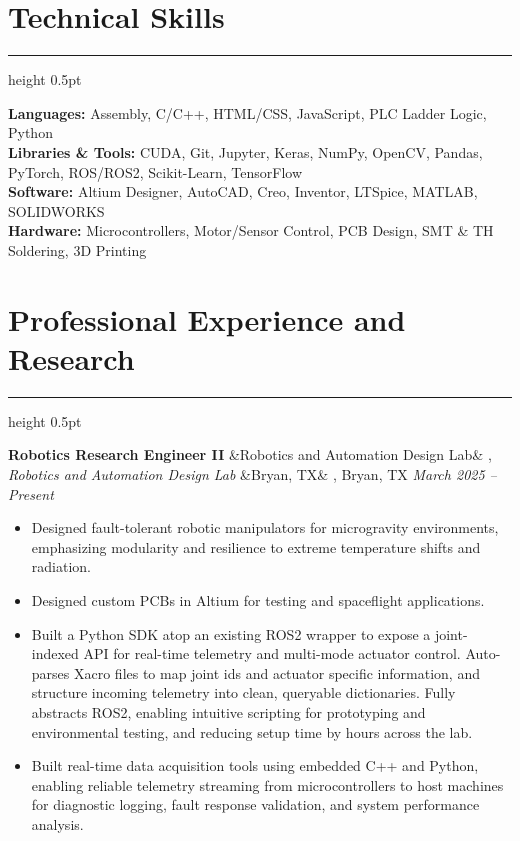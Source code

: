 \documentclass[letterpaper,10pt]{article}
\newcommand{\heading}[1]{%
    \vspace{-5mm} %
    \section*{#1}%
    \vspace{-3mm}%
    \noindent\hrule height 0.5pt %
    \vspace{4mm}%
}
\newcommand{\experience}[5]{%
    \noindent\textbf{#1}%
    \ifx&#2&
    \else
        , \textit{#2}%
    \fi
    \ifx&#3&
    \else
        , #3%
    \fi
    \hfill \textit{#4} \\
    \vspace{-6.8mm}%
    \begin{itemize}[itemsep=-5pt]
        \setlength{\itemindent}{0em}
        #5
    \end{itemize}
    \vspace{1mm}
}
\begin{document}
\heading{Technical Skills}
\vspace{-1mm}%
\noindent\textbf{Languages:} Assembly, C/C++, HTML/CSS, JavaScript, PLC Ladder Logic, Python \\
\textbf{Libraries \& Tools:} CUDA, Git, Jupyter, Keras, NumPy, OpenCV, Pandas, PyTorch, ROS/ROS2, Scikit-Learn, TensorFlow \\
\textbf{Software:} Altium Designer, AutoCAD, Creo, Inventor, LTSpice, MATLAB, SOLIDWORKS \\
\textbf{Hardware:} Microcontrollers, Motor/Sensor Control, PCB Design, SMT \& TH Soldering, 3D Printing \\


\heading{Professional Experience and Research}

\experience
    {Robotics Research Engineer II}
    {Robotics and Automation Design Lab}
    {Bryan, TX}
    {March 2025 – Present}
    {
        \item Designed fault-tolerant robotic manipulators for microgravity environments, emphasizing modularity and resilience to extreme temperature shifts and radiation.
        \item Designed custom PCBs in Altium for testing and spaceflight applications.
        \item Built a Python SDK atop an existing ROS2 wrapper to expose a joint-indexed API for real-time telemetry and multi-mode actuator control. Auto-parses Xacro files to map joint ids and actuator specific information, and structure incoming telemetry into clean, queryable dictionaries. Fully abstracts ROS2, enabling intuitive scripting for prototyping and environmental testing, and reducing setup time by hours across the lab.
        \item Built real-time data acquisition tools using embedded C++ and Python, enabling reliable telemetry streaming from microcontrollers to host machines for diagnostic logging, fault response validation, and system performance analysis.

    }
\end{document}
